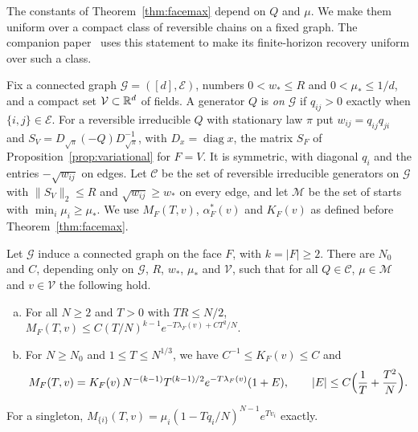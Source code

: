 The constants of Theorem~\ref{thm:facemax} depend on $Q$ and $\mu$. We make them
uniform over a compact class of reversible chains on a fixed graph. The companion paper\ifarxivbuild~\cite{paperC2}\fi{} uses this statement to make its
finite-horizon recovery uniform over such a class.

Fix a connected graph $\mathcal G=([d],\mathcal E)$, numbers $0<w_*\le R$ and
$0<\mu_*\le1/d$, and a compact set $\mathcal V\subset\mathbb{R}^d$ of fields. A generator $Q$ is
\emph{on $\mathcal G$} if $q_{ij}>0$ exactly when $\{i,j\}\in\mathcal E$. For a reversible
irreducible $Q$ with stationary law $\pi$ put $w_{ij}=q_{ij}q_{ji}$ and
$S_V=D_{\sqrt\pi}(-Q)D_{\sqrt\pi}^{-1}$, with $D_x=\operatorname{diag}x$, the matrix $S_F$ of
Proposition~\ref{prop:variational} for $F=V$. It is symmetric, with diagonal $q_i$ and
the entries $-\sqrt{w_{ij}}$ on edges. Let $\mathcal C$ be the set of reversible
irreducible generators on $\mathcal G$ with $\|S_V\|_2\le R$ and $\sqrt{w_{ij}}\ge w_*$ on
every edge, and let $\mathcal M$ be the set of starts with $\min_i\mu_i\ge\mu_*$. We use
$M_F(T,v)$, $\alpha^*_F(v)$ and $K_F(v)$ as defined before Theorem~\ref{thm:facemax}.

\begin{proposition}\label{prop:uniform-facemax}
Let $\mathcal G$ induce a connected graph on the face $F$, with $k=|F|\ge2$. There are
$N_0$ and $C$, depending only on $\mathcal G$, $R$, $w_*$, $\mu_*$ and $\mathcal V$, such that for all
$Q\in\mathcal C$, $\mu\in\mathcal M$ and $v\in\mathcal V$ the following hold.
\begin{enumerate}[(a)]
\item For all $N\ge2$ and $T>0$ with $TR\le N/2$,
$M_F(T,v)\le C(T/N)^{k-1}e^{-T\lambda_F(v)+CT^2/N}$.
\item For $N\ge N_0$ and $1\le T\le N^{1/3}$, we have $C^{-1}\le K_F(v)\le C$ and
\[
 M_F(T,v)=K_F(v)\,N^{-(k-1)}T^{(k-1)/2}e^{-T\lambda_F(v)}(1+E),\qquad
 |E|\le C\Bigl(\frac1T+\frac{T^2}N\Bigr).
\]
\end{enumerate}
For a singleton, $M_{\{i\}}(T,v)=\mu_i(1-Tq_i/N)^{N-1}e^{Tv_i}$ exactly.
\end{proposition}

